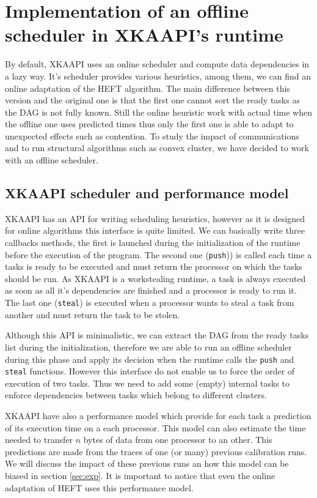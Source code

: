 \documentclass[10pt, conference, compsocconf,pdftex,dvipsnames]{IEEEtran}
\begin{document}
\section{Implementation of an offline scheduler in XKAAPI's runtime}
\label{sec:impl}

By default, XKAAPI uses an online scheduler and compute data dependencies in a
lazy way. It's scheduler provides various heuristics, among them, we can find
an online adaptation of the HEFT algorithm. The main difference between this
version and the original one is that the first one cannot sort the ready tasks
as the DAG is not fully known.  Still the online heuristic work with actual
time when the offline one uses predicted times thus only the first one is able
to adapt to unexpected effects such as contention. To study the impact of
communications and to run structural algorithms such as convex cluster, we
have decided to work with an offline scheduler.

\subsection{XKAAPI scheduler and performance model}
\label{sec:impl-kaapi}

XKAAPI has an API for writing scheduling heuristics, however as it is designed
for online algorithms this interface is quite limited. We can basically write
three callbacks methods, the first is launched during the initialization of
the runtime before the execution of the program. The second one
(\texttt{push})) is called each time a tasks is ready to be executed and must
return the processor on which the tasks should be run. As XKAAPI is a
workstealing runtime, a task is always executed as soon as all it's
dependencies are finished and a processor is ready to run it. The last one
(\texttt{steal}) is executed when a processor wants to steal a task from
another and must return the task to be stolen.

Although this API is minimalistic, we can extract the DAG from the ready tasks
list during the initialization, therefore we are able to run an offline
scheduler during this phase and apply its decision when the runtime calls the
\texttt{push} and \texttt{steal} functions. However this interface do not
enable us to force the order of execution of two tasks. Thus we need to add
some (empty) internal tasks to enforce dependencies between tasks which belong
to different clusters.

XKAAPI have also a performance model which provide for each task a prediction
of its execution time on a each processor. This model can also estimate the 
time needed to transfer $n$ bytes of data from one processor to an other. This
predictions are made from the traces of one (or many) previous calibration
runs. We will discuss the impact of these previous runs an how this model can
be biased in section \ref{sec:exp}. It is important to notice that even the
online adaptation of HEFT uses this performance model.
\end{document}
